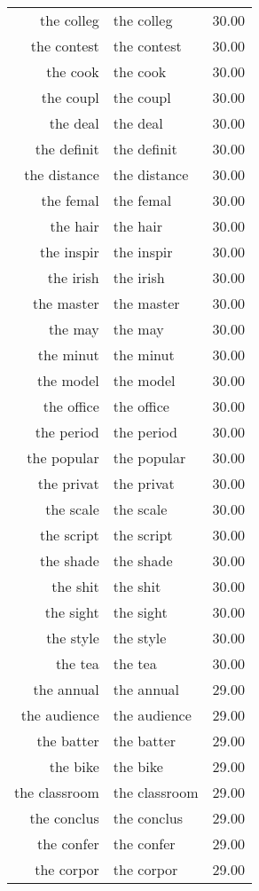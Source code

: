 \begin{table}[ht]
\begin{tabular}{rlr}
  the colleg & the colleg & 30.00 \\ 
  the contest & the contest & 30.00 \\ 
  the cook & the cook & 30.00 \\ 
  the coupl & the coupl & 30.00 \\ 
  the deal & the deal & 30.00 \\ 
  the definit & the definit & 30.00 \\ 
  the distance & the distance & 30.00 \\ 
  the femal & the femal & 30.00 \\ 
  the hair & the hair & 30.00 \\ 
  the inspir & the inspir & 30.00 \\ 
  the irish & the irish & 30.00 \\ 
  the master & the master & 30.00 \\ 
  the may & the may & 30.00 \\ 
  the minut & the minut & 30.00 \\ 
  the model & the model & 30.00 \\ 
  the office & the office & 30.00 \\ 
  the period & the period & 30.00 \\ 
  the popular & the popular & 30.00 \\ 
  the privat & the privat & 30.00 \\ 
  the scale & the scale & 30.00 \\ 
  the script & the script & 30.00 \\ 
  the shade & the shade & 30.00 \\ 
  the shit & the shit & 30.00 \\ 
  the sight & the sight & 30.00 \\ 
  the style & the style & 30.00 \\ 
  the tea & the tea & 30.00 \\ 
  the annual & the annual & 29.00 \\ 
  the audience & the audience & 29.00 \\ 
  the batter & the batter & 29.00 \\ 
  the bike & the bike & 29.00 \\ 
  the classroom & the classroom & 29.00 \\ 
  the conclus & the conclus & 29.00 \\ 
  the confer & the confer & 29.00 \\ 
  the corpor & the corpor & 29.00 \\ 

\end{tabular}
\end{table}
